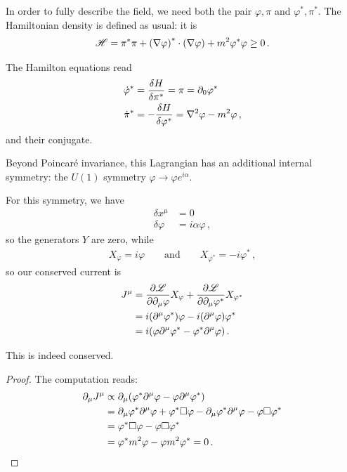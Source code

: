 \documentclass[main.tex]{subfiles}
\begin{document}
In order to fully describe the field, we need both the pair \(\varphi, \pi  \) and \(\varphi^{*}, \pi^{*}\). 
The Hamiltonian density is defined as usual: it is 
%
\begin{align}
\mathscr{H} = \pi^{* } \pi + \qty(\nabla \varphi )^{*} \cdot \qty(\nabla \varphi ) + m^2\varphi^{*} \varphi \geq 0
\,.
\end{align}

\begin{claim}
The Hamilton equations read 
%
\begin{align}
\dot{\varphi}^{*} &= \fdv{H}{\pi^{*}} 
= \pi = \partial_0 \varphi^{*} \\
\dot{\pi}^{*} &= - \fdv{H}{\varphi^{*}} 
= \nabla^2 \varphi  -m^2 \varphi 
\,,
\end{align}
%
and their conjugate.
\end{claim}


Beyond Poincaré invariance, this Lagrangian has an additional internal symmetry: the \(U(1)\) symmetry \(\varphi \to \varphi e^{i \alpha }\). 

For this symmetry, we have 
%
\begin{align}
\delta x^{\mu } &= 0   \\
\delta \varphi &= i \alpha \varphi 
\,,
\end{align}
%
so the generators \(Y\) are zero, while 
%
\begin{align}
X_{\varphi } = i \varphi  
\qquad \text{and} \qquad
X_{\varphi^{*}} = -i \varphi^{*}
\,,
\end{align}
%
so our conserved current is 
%
\begin{align}
J^{\mu } &= \pdv{\mathscr{L}}{\partial_{\mu} \varphi} X_{\varphi } + \pdv{\mathscr{L}}{\partial_{\mu} \varphi^{*}} X_{\varphi^{*}}  \\
&= i \qty(\partial^{\mu } \varphi^{*}) \varphi 
- i \qty(\partial^{\mu} \varphi ) \varphi^{*}  \\
&= i \qty(\varphi \partial^{\mu} \varphi^{*}- \varphi^{*} \partial^{\mu } \varphi )
\,.
\end{align}

\begin{claim}
This is indeed conserved.
\end{claim}

\begin{proof}
The computation reads: 
%
\begin{align}
\partial_{\mu }J^{\mu } &\propto
\partial_{\mu } \qty(\varphi^{*} \partial^{\mu } \varphi 
- \varphi \partial^{\mu } \varphi^{*})  \\
&= \partial_{\mu } \varphi^{*} \partial^{\mu } \varphi  
+ \varphi^{*} \square \varphi 
- \partial_{\mu } \varphi^{*} \partial^{\mu } \varphi 
- \varphi \square \varphi^{*}  \\
&= \varphi^{*} \square \varphi 
- \varphi \square \varphi^{*}   \\
&= \varphi^{*} m^2 \varphi - \varphi m^2 \varphi^{* } = 0
\,.
\end{align}
\end{proof}
\end{document}
